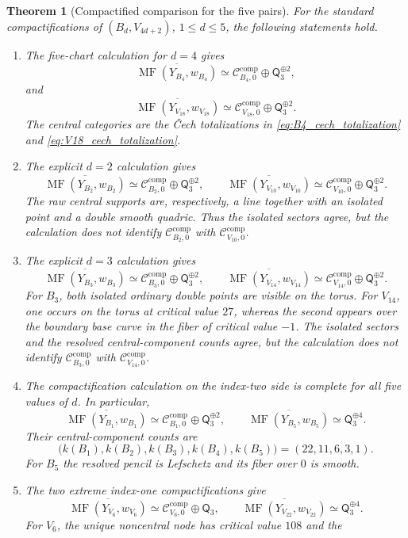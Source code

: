 \documentclass[11pt]{amsart}
\newtheorem{theorem}{Theorem}[section]
\theoremstyle{definition}
\theoremstyle{remark}
\DeclareMathOperator{\MF}{MF}
\newcommand{\MorseCat}[1]{\mathsf{Q}_{#1}}
\newcommand{\CcompB}{\mathcal C^{\mathrm{comp}}_{B_4,0}}
\newcommand{\CcompV}{\mathcal C^{\mathrm{comp}}_{V_{18},0}}
\newcommand{\CcompBtwo}{\mathcal C^{\mathrm{comp}}_{B_2,0}}
\newcommand{\CcompVten}{\mathcal C^{\mathrm{comp}}_{V_{10},0}}
\newcommand{\CcompBthree}{\mathcal C^{\mathrm{comp}}_{B_3,0}}
\newcommand{\CcompVfourteen}{\mathcal C^{\mathrm{comp}}_{V_{14},0}}
\newcommand{\CcompBone}{\mathcal C^{\mathrm{comp}}_{B_1,0}}
\newcommand{\CcompVsix}{\mathcal C^{\mathrm{comp}}_{V_6,0}}
\begin{document}
\begin{theorem}[Compactified comparison for the five pairs]
\label{thm:five_pair_conclusion}
For the standard compactifications of $(B_d,V_{4d+2})$, $1\leq d\leq5$, the
following statements hold.
\begin{enumerate}[label=\textup{(\alph*)}]
\item The five-chart calculation for $d=4$ gives
\[
\overline{\MF(Y_{B_4},w_{B_4})}
\simeq\CcompB\oplus\MorseCat{3}^{\oplus2},
\]
and
\[
\overline{\MF(Y_{V_{18}},w_{V_{18}})}
\simeq\CcompV\oplus\MorseCat{3}^{\oplus2}.
\]
The central categories are the Čech totalizations in
\eqref{eq:B4_cech_totalization} and \eqref{eq:V18_cech_totalization}.
\item The explicit $d=2$ calculation gives
\[
\overline{\MF(Y_{B_2},w_{B_2})}
\simeq\CcompBtwo\oplus\MorseCat{3}^{\oplus2},
\qquad
\overline{\MF(Y_{V_{10}},w_{V_{10}})}
\simeq\CcompVten\oplus\MorseCat{3}^{\oplus2}.
\]
The raw central supports are, respectively, a line together with an isolated
point and a double smooth quadric.  Thus the isolated sectors agree, but the
calculation does not identify $\CcompBtwo$ with $\CcompVten$.
\item The explicit $d=3$ calculation gives
\[
\overline{\MF(Y_{B_3},w_{B_3})}
\simeq\CcompBthree\oplus\MorseCat{3}^{\oplus2},
\qquad
\overline{\MF(Y_{V_{14}},w_{V_{14}})}
\simeq\CcompVfourteen\oplus\MorseCat{3}^{\oplus2}.
\]
For $B_3$, both isolated ordinary double points are visible on the torus.
For $V_{14}$, one occurs on the torus at critical value $27$, whereas the
second appears over the boundary base curve in the fiber of critical value
$-1$.  The isolated sectors and the resolved central-component counts agree,
but the calculation does not identify $\CcompBthree$ with
$\CcompVfourteen$.
\item The compactification calculation on the index-two side is complete for
all five values of $d$.  In particular,
\[
\overline{\MF(Y_{B_1},w_{B_1})}
\simeq\CcompBone\oplus\MorseCat{3}^{\oplus2},
\qquad
\overline{\MF(Y_{B_5},w_{B_5})}
\simeq\MorseCat{3}^{\oplus4}.
\]
Their central-component counts are
\[
\bigl(k(B_1),k(B_2),k(B_3),k(B_4),k(B_5)\bigr)
=(22,11,6,3,1).
\]
For $B_5$ the resolved pencil is Lefschetz and its fiber over $0$ is smooth.
\item The two extreme index-one compactifications give
\[
\overline{\MF(Y_{V_6},w_{V_6})}
\simeq\CcompVsix\oplus\MorseCat{3},
\qquad
\overline{\MF(Y_{V_{22}},w_{V_{22}})}
\simeq\MorseCat{3}^{\oplus4}.
\]
For $V_6$, the unique noncentral node has critical value $108$ and the

\end{enumerate}
\end{theorem}
\end{document}
